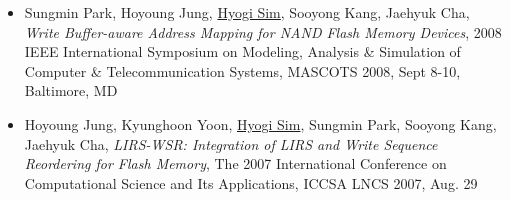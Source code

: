 \begin{itemize}
 {\it Using Non-Volatile RAM as a Write Buffer for NAND Flash Memory-based
 Storage Devices},
 2008 IEEE International Symposium on Modeling, Analysis \& Simulation of
 Computer \& Telecommunication Systems, MASCOTS 2008, Sept 8-10, Baltimore, MD
\item Sungmin Park, Hoyoung Jung, \underline{Hyogi Sim}, Sooyong Kang, Jaehyuk Cha,
 {\it Write Buffer-aware Address Mapping for NAND Flash Memory Devices},
 2008 IEEE International Symposium on Modeling, Analysis \& Simulation of
 Computer \& Telecommunication Systems, MASCOTS 2008, Sept 8-10, Baltimore, MD
\item Hoyoung Jung, Kyunghoon Yoon, \underline{Hyogi Sim},
 Sungmin Park, Sooyong Kang, Jaehyuk Cha,
 {\it LIRS-WSR: Integration of LIRS and Write Sequence Reordering for Flash
 Memory},
 The 2007 International Conference on Computational Science and Its
 Applications, ICCSA LNCS 2007, Aug. 29
\end{itemize}

